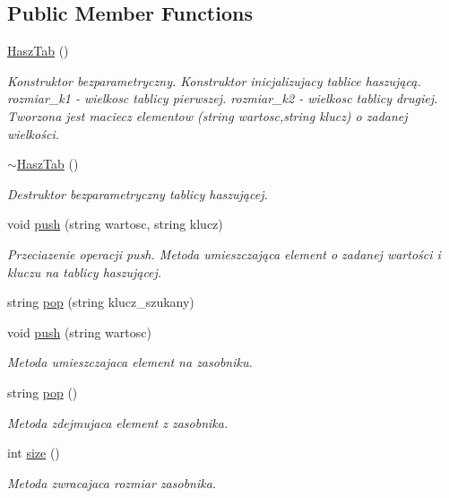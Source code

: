 \subsection*{Public Member Functions}
\begin{DoxyCompactItemize}
\item 
\hyperlink{a00010_a8c439035d939ca124f6bfdcec24d31a6}{Hasz\+Tab} ()
\begin{DoxyCompactList}\small\item\em Konstruktor bezparametryczny. Konstruktor inicjalizujacy tablice haszującą. rozmiar\+\_\+k1 -\/ wielkosc tablicy pierwszej. rozmiar\+\_\+k2 -\/ wielkosc tablicy drugiej. Tworzona jest maciecz elementow (string wartosc,string klucz) o zadanej wielkości. \end{DoxyCompactList}\item 
\hyperlink{a00010_ad2ec227290ea1e25bc5fa8a7bd6d67fa}{$\sim$\+Hasz\+Tab} ()
\begin{DoxyCompactList}\small\item\em Destruktor bezparametryczny tablicy haszującej. \end{DoxyCompactList}\item 
void \hyperlink{a00010_a6c09fe064d3e5dfe99a075ed5db2b33f}{push} (string wartosc, string klucz)
\begin{DoxyCompactList}\small\item\em Przeciazenie operacji push. Metoda umieszczająca element o zadanej wartości i kluczu na tablicy haszującej. \end{DoxyCompactList}\item 
string \hyperlink{a00010_a7eedb12f1f29e243b7cc7616999a93de}{pop} (string klucz\+\_\+szukany)
\item 
void \hyperlink{a00010_a91805f33da69af9e86c7e366f3d5bb05}{push} (string wartosc)
\begin{DoxyCompactList}\small\item\em Metoda umieszczajaca element na zasobniku. \end{DoxyCompactList}\item 
string \hyperlink{a00010_a179ed12fcf0f5b5d0ad98f5e9d1eff61}{pop} ()
\begin{DoxyCompactList}\small\item\em Metoda zdejmujaca element z zasobnika. \end{DoxyCompactList}\item 
int \hyperlink{a00010_a301a4903312b6c6633da230107e30963}{size} ()
\begin{DoxyCompactList}\small\item\em Metoda zwracajaca rozmiar zasobnika. \end{DoxyCompactList}\item 

\end{DoxyCompactItemize}
